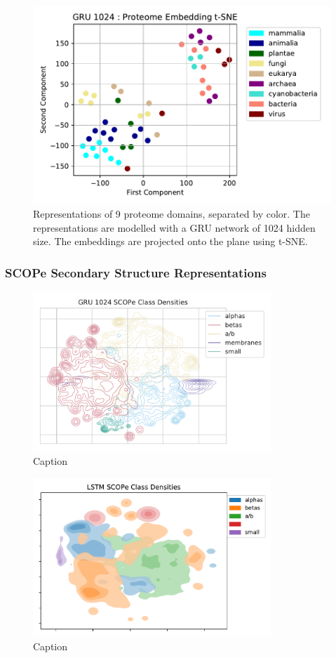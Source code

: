 \documentclass[a4paper,12pt]{article}
\begin{document}
\begin{figure}[H]
    \centering
    \includegraphics[width=0.8\linewidth]{figures/fig2b_GRU_1024_no_trunc.pdf}
    \caption{Representations of 9 proteome domains, separated by color. The representations are modelled with a GRU network of 1024 hidden size. The embeddings are projected onto the plane using t-SNE.}
    \label{fig:fig2b_GRU}
\end{figure}

\subsubsection{SCOPe Secondary Structure Representations}

\begin{figure}[H]
    \centering
    \includegraphics[width=0.8\textwidth]{figures/fig2c_GRU_1024_no_trunc.pdf}
    \caption{Caption}
    \label{fig:fig2c_GRU}
\end{figure}

\begin{figure}[H]
    \centering
    \includegraphics[width=0.8\textwidth]{figures/fig2c_LSTM.pdf}
    \caption{Caption}
    \label{fig:fig2c_LSTM}
\end{figure}
\end{document}
